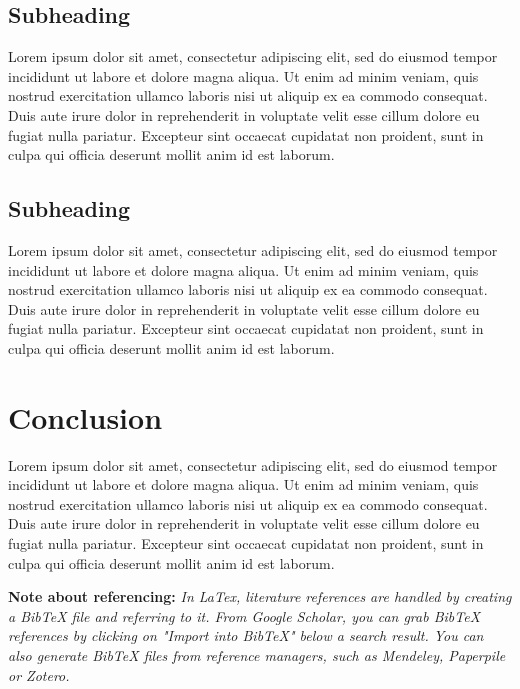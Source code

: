 \documentclass[11pt]{report}
\begin{document}
\section{Subheading}

Lorem ipsum dolor sit amet, consectetur adipiscing elit, sed do eiusmod tempor incididunt ut labore et dolore magna aliqua. Ut enim ad minim veniam, quis nostrud exercitation ullamco laboris nisi ut aliquip ex ea commodo consequat. Duis aute irure dolor in reprehenderit in voluptate velit esse cillum dolore eu fugiat nulla pariatur. Excepteur sint occaecat cupidatat non proident, sunt in culpa qui officia deserunt mollit anim id est laborum.

\section{Subheading}

Lorem ipsum dolor sit amet, consectetur adipiscing elit, sed do eiusmod tempor incididunt ut labore et dolore magna aliqua. Ut enim ad minim veniam, quis nostrud exercitation ullamco laboris nisi ut aliquip ex ea commodo consequat. Duis aute irure dolor in reprehenderit in voluptate velit esse cillum dolore eu fugiat nulla pariatur. Excepteur sint occaecat cupidatat non proident, sunt in culpa qui officia deserunt mollit anim id est laborum.

\chapter{Conclusion} \label{sec:conclusion}

Lorem ipsum dolor sit amet, consectetur adipiscing elit, sed do eiusmod tempor incididunt ut labore et dolore magna aliqua. Ut enim ad minim veniam, quis nostrud exercitation ullamco laboris nisi ut aliquip ex ea commodo consequat. Duis aute irure dolor in reprehenderit in voluptate velit esse cillum dolore eu fugiat nulla pariatur. Excepteur sint occaecat cupidatat non proident, sunt in culpa qui officia deserunt mollit anim id est laborum.

\textbf{Note about referencing:} \textit{In LaTex, literature references are handled by creating a BibTeX file and referring to it. From Google Scholar, you can grab BibTeX references by clicking on "Import into BibTeX" below a search result. You can also generate BibTeX files from reference managers, such as Mendeley, Paperpile or Zotero.}


\end{document}
